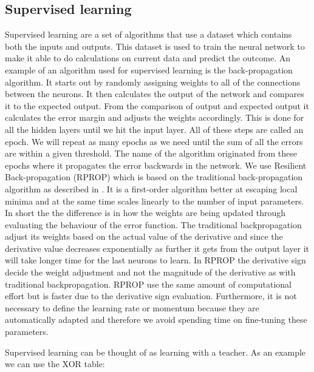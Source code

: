 \subsection{Supervised learning}
Supervised learning are a set of algorithms that use a dataset which contains both the inputs and outputs. This dataset is used to train the neural network to make it able to do calculations on current data and predict the outcome. An example of an algorithm used for supervised learning is the back-propagation algorithm. 
It starts out by randomly assigning weights to all of the connections between the neurons. It then calculates the output of the network and compares it to the expected output. From the comparison of output and expected output it calculates the error margin and adjusts the weights accordingly. This is done for all the hidden layers until we hit the input layer. All of these steps are called an epoch. We will repeat as many epochs as we need until the sum of all the errors are within a given threshold. The name of the algorithm originated from these epochs where it propagates the error backwards in the network. We use Resilient Back-propagation (RPROP) which is based on the traditional back-propagation algorithm as described in \cite{rpropForGeometricDilution,adaptiveRprop}. It is a first-order algorithm better at escaping local minima and at the same time scales linearly to the number of input parameters. In short the the difference is in how the weights are being updated through evaluating the behaviour of the error function. The traditional backpropagation adjust its weights based on the actual value of the derivative and since the derivative value decreases exponentially as further it gets from the output layer it will take longer time for the last neurons to learn. In RPROP the derivative sign decide the weight adjustment and not the magnitude of the derivative as with traditional backpropagation. RPROP use the same amount of computational effort but is faster due to the derivative sign evaluation. Furthermore, it is not necessary to define the learning rate or momentum because they are automatically adapted and therefore we avoid spending time on fine-tuning these parameters.

Supervised learning can be thought of as learning with a teacher. As an example we can use the XOR table:

